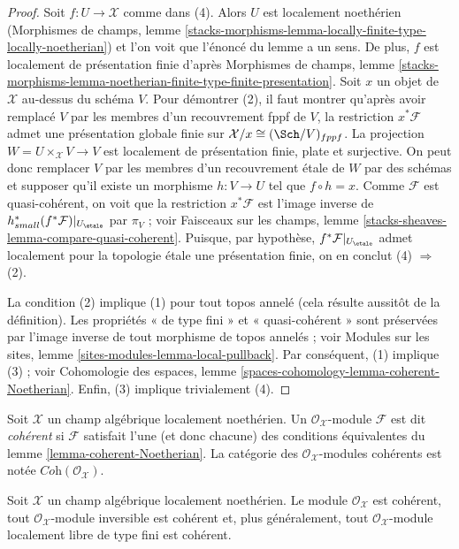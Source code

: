 \begin{proof}
Soit $f : U \to \mathcal{X}$ comme dans (4).
Alors $U$ est localement noethérien (Morphismes de champs, lemme
\ref{stacks-morphisms-lemma-locally-finite-type-locally-noetherian})
et l'on voit que l'énoncé du lemme a un sens. De plus,
$f$ est localement de présentation finie d'après Morphismes de champs, lemme
\ref{stacks-morphisms-lemma-noetherian-finite-type-finite-presentation}.
Soit $x$ un objet de $\mathcal{X}$ au-dessus du schéma $V$.
Pour démontrer (2), il faut montrer qu'après avoir remplacé $V$
par les membres d'un recouvrement fppf de $V$, la restriction $x^*\mathcal{F}$
admet une présentation globale finie sur $\mathcal{X}/x \cong (\Sch/V)_{fppf}$.
La projection $W = U \times_\mathcal{X} V \to V$ est
localement de présentation finie, plate et surjective.
On peut donc remplacer $V$ par les membres d'un recouvrement étale de $W$
par des schémas et supposer qu'il existe un morphisme $h : V \to U$ tel que $f \circ h = x$.
Comme $\mathcal{F}$ est quasi-cohérent, on voit que
la restriction $x^*\mathcal{F}$
est l'image inverse de $h_{small}^*(f^*\mathcal{F})|_{U_\etale}$
par $\pi_V$ ; voir Faisceaux sur les champs, lemme
\ref{stacks-sheaves-lemma-compare-quasi-coherent}.
Puisque, par hypothèse, $f^*\mathcal{F}|_{U_\etale}$ admet localement pour la
topologie étale une présentation finie, on en conclut
(4) $\Rightarrow$ (2).

\medskip\noindent
La condition (2) implique (1) pour tout topos annelé (cela résulte aussitôt de la définition).
Les propriétés « de type fini » et « quasi-cohérent »
sont préservées par l'image inverse de tout morphisme de topos annelés ; voir
Modules sur les sites, lemme \ref{sites-modules-lemma-local-pullback}.
Par conséquent, (1) implique (3) ; voir Cohomologie des espaces, lemme
\ref{spaces-cohomology-lemma-coherent-Noetherian}.
Enfin, (3) implique trivialement (4).
\end{proof}

\begin{definition}
\label{definition-coherent}
Soit $\mathcal{X}$ un champ algébrique localement noethérien.
Un $\mathcal{O}_\mathcal{X}$-module $\mathcal{F}$ est dit {\it cohérent}
si $\mathcal{F}$ satisfait l'une (et donc chacune) des conditions
équivalentes du lemme \ref{lemma-coherent-Noetherian}.
La catégorie des $\mathcal{O}_\mathcal{X}$-modules cohérents est
notée $\textit{Coh}(\mathcal{O}_\mathcal{X})$.
\end{definition}

\begin{lemma}
\label{lemma-elementary-coherent}
Soit $\mathcal{X}$ un champ algébrique localement noethérien.
Le module $\mathcal{O}_\mathcal{X}$ est cohérent, tout
$\mathcal{O}_\mathcal{X}$-module inversible est cohérent et, plus généralement, tout
$\mathcal{O}_\mathcal{X}$-module localement libre de type fini est cohérent.
\end{lemma}

